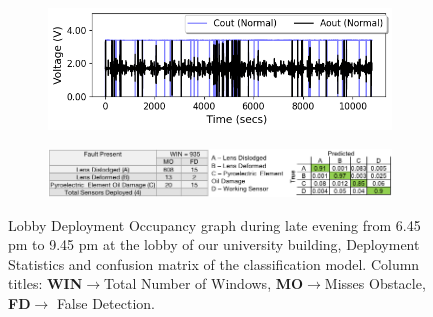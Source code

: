 \begin{figure}
	\centering
	\begin{subfigure}[t]{0.4\textwidth}
		\centering
		\includegraphics[width=\textwidth]{figures/deployment/lobby/lateafternoon-3hrs.png}
		\caption{}
        \label{fig:deployment_csl_lobby}%
	\end{subfigure}\hfill%
	\begin{subfigure}[b]{0.59\textwidth}
	    \centering
	    \includegraphics[width=\textwidth]{figures/deployment/lobby/confusion-matrix-lobby-camera-ready.png}
	    \caption{}
	    \label{fig:lobby_classification_results}
	\end{subfigure}
	\caption{\footnotesize Lobby Deployment \ca Occupancy graph during late evening from 6.45 pm to 9.45 pm at the lobby of our university building, \cb Deployment Statistics and confusion matrix of the classification model. Column titles: \textbf{WIN}$\rightarrow$Total Number of Windows, \textbf{MO}$\rightarrow$Misses Obstacle, \textbf{FD}$\rightarrow$ False Detection.} 
\end{figure}

